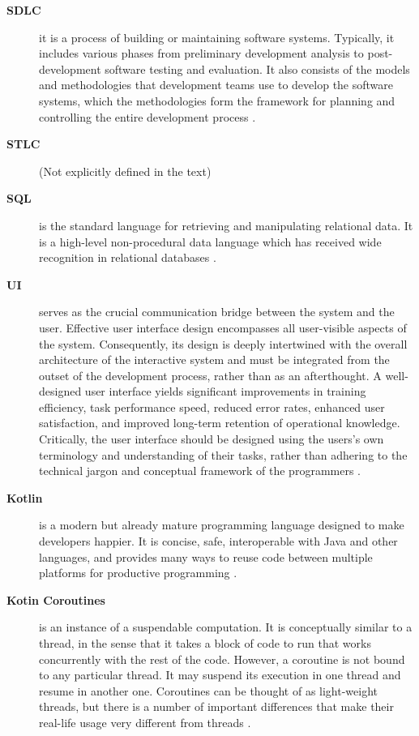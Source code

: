 \begin{description}
\item[\textbf{SDLC}] it is a process of building or maintaining software systems. Typically, it includes various phases from preliminary development analysis to post-development software testing and evaluation. It also consists of the models and methodologies that development teams use to develop the software systems, which the methodologies form the framework for planning and controlling the entire development process \cite{leau2012software}.

\item[\textbf{STLC}] 
    (Not explicitly defined in the text)

\item[\textbf{SQL}] is the standard language for retrieving and manipulating relational data.  It is a high-level non-procedural data language which has received wide recognition in relational databases \cite{blacher2022machine, kim1982optimizing}. 

\item[\textbf{UI}] serves as the crucial communication bridge between the system and the user. Effective user interface design encompasses all user-visible aspects of the system. Consequently, its design is deeply intertwined with the overall architecture of the interactive system and must be integrated from the outset of the development process, rather than as an afterthought. A well-designed user interface yields significant improvements in training efficiency, task performance speed, reduced error rates, enhanced user satisfaction, and improved long-term retention of operational knowledge. Critically, the user interface should be designed using the users's own terminology and understanding of their tasks, rather than adhering to the technical jargon and conceptual framework of the programmers \cite{jacob2003}.

\item[\textbf{Kotlin}]  is a modern but already mature programming language designed to make developers happier. It is concise, safe, interoperable with Java and other languages, and provides many ways to reuse code between multiple platforms for productive programming \cite{kotlin_getting_started}.

\item[\textbf{Kotin Coroutines}]  is an instance of a suspendable computation. It is conceptually similar to a thread, in the sense that it takes a block of code to run that works concurrently with the rest of the code. However, a coroutine is not bound to any particular thread. It may suspend its execution in one thread and resume in another one. Coroutines can be thought of as light-weight threads, but there is a number of important differences that make their real-life usage very different from threads \cite{kotlin_coroutine}.


\end{description}
